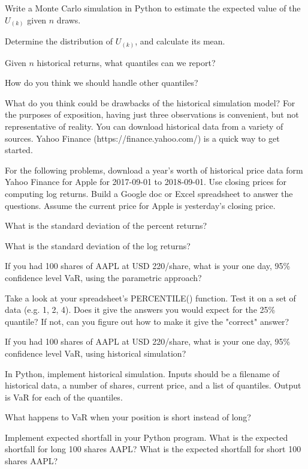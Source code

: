 \documentclass{report}
\numberwithin{problem}{chapter} %
\let\oldroblem\problem
\renewcommand{\problem}{ \oldroblem  \normalfont}
\newcommand{\vs}{\vspace}
\begin{document}
\problem Write a Monte Carlo simulation in Python to estimate the expected value of the $U_{(k)}$ given $n$ draws. 

\problem Determine the distribution of $U_{(k)}$, and calculate its mean. 

\problem Given $n$ historical returns, what quantiles can we report? 

\problem How do you think we should handle other quantiles?

\problem What do you think could be drawbacks of the historical simulation model?
\vs{5mm}
For the purposes of exposition, having just three observations is convenient, but not representative of reality. You can download historical data from a variety of sources. Yahoo Finance (https://finance.yahoo.com/) is a quick way to get started. 

For the following problems, download a year's worth of historical price data form Yahoo Finance for Apple for 2017-09-01 to 2018-09-01. Use closing prices for computing log returns.  Build a Google doc or Excel spreadsheet to answer the questions. Assume the current price for Apple is yesterday's closing price. 

\problem What is the standard deviation of the percent returns?

\problem What is the standard deviation of the log returns?

\problem If you had 100 shares of AAPL at USD 220/share, what is your one day, 95\% confidence level VaR, using the parametric approach?

\problem Take a look at your spreadsheet's PERCENTILE() function. Test it on a set of data (e.g. {1, 2, 4}). Does it give the answers you would expect for the 25\% quantile? If not, can you figure out how to make it give the "correct" answer?

\problem If you had 100 shares of AAPL at USD 220/share, what is your one day, 95\% confidence level VaR, using  historical simulation?

\problem In Python, implement historical simulation. Inputs should be a filename of historical data, a number of shares, current price, and a list of quantiles. Output is VaR for each of the quantiles. 

\problem What happens to VaR when your position is short instead of long?

\problem Implement \gls{expected shortfall} in your Python program. What is the expected shortfall for long 100 shares AAPL? What is the expected shortfall for short 100 shares AAPL? 
\end{document}
